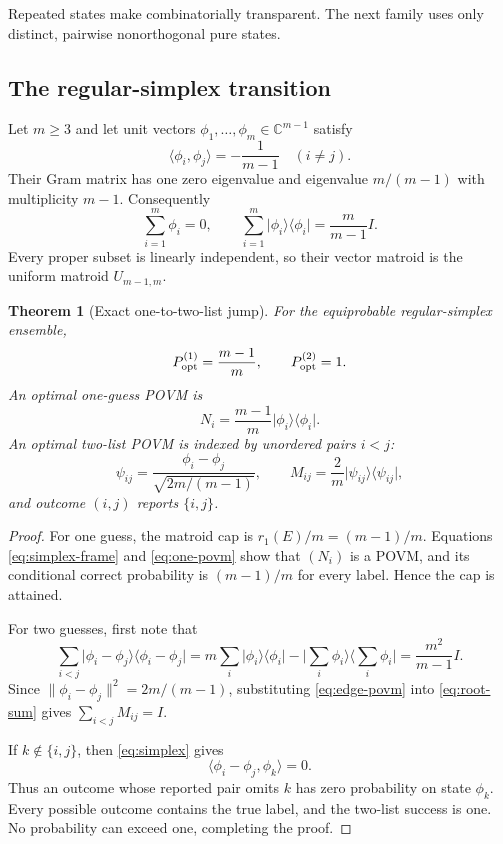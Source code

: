 \documentclass[11pt]{article}
\newtheorem{theorem}{Theorem}[section]
\theoremstyle{definition}
\theoremstyle{remark}
\newcommand{\C}{\mathbb C}
\newcommand{\ket}[1]{\lvert #1\rangle}
\newcommand{\bra}[1]{\langle #1\rvert}
\begin{document}
Repeated states make  combinatorially transparent.  The
next family uses only distinct, pairwise nonorthogonal pure states.

\subsection{The regular-simplex transition}

Let $m\geq3$ and let unit vectors
$\phi_1,\ldots,\phi_m\in\C^{m-1}$ satisfy
\begin{equation}\label{eq:simplex}
 \langle\phi_i,\phi_j\rangle=-\frac1{m-1}\quad(i\ne j).
\end{equation}
Their Gram matrix has one zero eigenvalue and eigenvalue $m/(m-1)$ with
multiplicity $m-1$.  Consequently
\begin{equation}\label{eq:simplex-frame}
 \sum_{i=1}^m\phi_i=0,\qquad
 \sum_{i=1}^m\ket{\phi_i}\!\bra{\phi_i}
 =\frac{m}{m-1}I.
\end{equation}
Every proper subset is linearly independent, so their vector matroid is the
uniform matroid $U_{m-1,m}$.

\begin{theorem}[Exact one-to-two-list jump]\label{thm:simplex}
For the equiprobable regular-simplex ensemble,
\begin{equation}\label{eq:simplex-opt}
 P_{\rm opt}^{(1)}=\frac{m-1}{m},\qquad
 P_{\rm opt}^{(2)}=1.
\end{equation}
An optimal one-guess POVM is
\begin{equation}\label{eq:one-povm}
 N_i=\frac{m-1}{m}\ket{\phi_i}\!\bra{\phi_i}.
\end{equation}
An optimal two-list POVM is indexed by unordered pairs $i<j$:
\begin{equation}\label{eq:edge-povm}
 \psi_{ij}=\frac{\phi_i-\phi_j}{\sqrt{2m/(m-1)}},\qquad
 M_{ij}=\frac2m\ket{\psi_{ij}}\!\bra{\psi_{ij}},
\end{equation}
and outcome $(i,j)$ reports $\{i,j\}$.
\end{theorem}

\begin{proof}
For one guess, the matroid cap is
$r_1(E)/m=(m-1)/m$.  Equations
\eqref{eq:simplex-frame} and \eqref{eq:one-povm} show that $(N_i)$ is a POVM,
and its conditional correct probability is $(m-1)/m$ for every label.  Hence
the cap is attained.

For two guesses, first note that
\begin{equation}\label{eq:root-sum}
 \sum_{i<j}\ket{\phi_i-\phi_j}\!\bra{\phi_i-\phi_j}
 =m\sum_i\ket{\phi_i}\!\bra{\phi_i}
   -\ket{\sum_i\phi_i}\!\bra{\sum_i\phi_i}
 =\frac{m^2}{m-1}I.
\end{equation}
Since $\|\phi_i-\phi_j\|^2=2m/(m-1)$, substituting
\eqref{eq:edge-povm} into \eqref{eq:root-sum} gives
$\sum_{i<j}M_{ij}=I$.

If $k\notin\{i,j\}$, then \eqref{eq:simplex} gives
\[
 \langle\phi_i-\phi_j,\phi_k\rangle=0.
\]
Thus an outcome whose reported pair omits $k$ has zero probability on state
$\phi_k$.  Every possible outcome contains the true label, and the two-list
success is one.  No probability can exceed one, completing the proof.
\end{proof}
\end{document}
